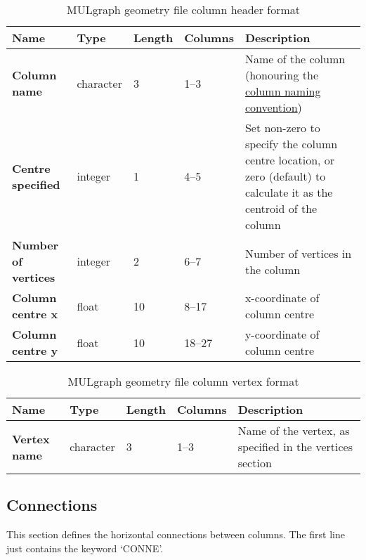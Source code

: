 \begin{table}[h]
  \begin{center}
    \begin{tabular}{|p{20mm}|l|l|l|p{50mm}|}
      \hline
      \textbf{Name} & \textbf{Type} & \textbf{Length} & \textbf{Columns} & \textbf{Description}\\
      \hline
      \textbf{Column name} & character & 3 & 1--3 & Name of the column (honouring the \hyperref[tb:mulgrid_conventions]{column naming convention})\\
      \hline
      \textbf{Centre specified} & integer & 1 & 4--5 & Set non-zero to specify the column centre location, or zero (default) to calculate it as the centroid of the column\\
      \hline
      \textbf{Number of vertices} & integer & 2 & 6--7 & Number of vertices in the column\\
      \hline
      \textbf{Column centre x} & float & 10 & 8--17 & x-coordinate of column centre\\
      \hline
      \textbf{Column centre y} & float & 10 & 18--27 & y-coordinate of column centre\\
      \hline
    \end{tabular}
    \caption{MULgraph geometry file column header format}
    \label{tb:mulgraph_format_column_header}
  \end{center}
\end{table}

\begin{table}[h]
  \begin{center}
    \begin{tabular}{|p{20mm}|l|l|l|p{50mm}|}
      \hline
      \textbf{Name} & \textbf{Type} & \textbf{Length} & \textbf{Columns} & \textbf{Description}\\
      \hline
      \textbf{Vertex name} & character & 3 & 1--3 & Name of the vertex, as specified in the vertices section\\
      \hline
    \end{tabular}
    \caption{MULgraph geometry file column vertex format}
    \label{tb:mulgraph_format_column_vertex}
  \end{center}
\end{table}

\subsection{Connections}
This section defines the horizontal connections between columns. The first line just contains the keyword `CONNE'.

